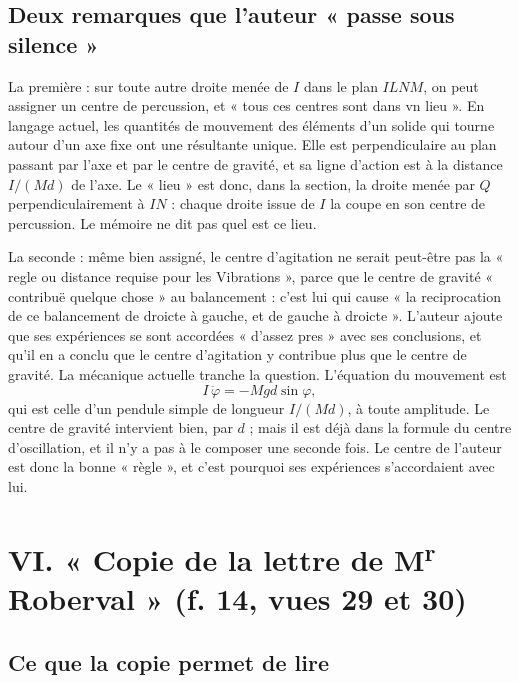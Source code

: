 \documentclass[11pt,a4paper]{article}
\begin{document}
\subsection*{Deux remarques que l'auteur « passe sous silence »}

La première : sur toute autre droite menée de \(I\) dans le plan \(ILNM\), on
peut assigner un centre de percussion, et « tous ces centres sont dans vn
lieu ». En langage actuel, les quantités de mouvement des éléments d'un solide
qui tourne autour d'un axe fixe ont une résultante unique. Elle est
perpendiculaire au plan passant par l'axe et par le centre de gravité, et sa
ligne d'action est à la distance \(I/(Md)\) de l'axe. Le « lieu » est donc,
dans la section, la droite menée par \(Q\) perpendiculairement à \(IN\) :
chaque droite issue de \(I\) la coupe en son centre de percussion. Le mémoire
ne dit pas quel est ce lieu.

La seconde : même bien assigné, le centre d'agitation ne serait peut-être pas la
« regle ou distance requise pour les Vibrations », parce que le centre de gravité
« contribuë quelque chose » au balancement : c'est lui qui cause « la
reciprocation de ce balancement de droicte à gauche, et de gauche à droicte ».
L'auteur ajoute que ses expériences se sont accordées « d'assez pres » avec ses
conclusions, et qu'il en a conclu que le centre d'agitation y contribue plus que
le centre de gravité. La mécanique actuelle tranche la question. L'équation du
mouvement est
\[
I\,\ddot\varphi=-Mgd\sin\varphi ,
\]
qui est celle d'un pendule simple de longueur \(I/(Md)\), à toute amplitude.
Le centre de gravité intervient bien, par \(d\) ; mais il est déjà dans la
formule du centre d'oscillation, et il n'y a pas à le composer une seconde
fois. Le centre de l'auteur est donc la bonne « règle », et c'est pourquoi ses
expériences s'accordaient avec lui.

\section*{VI. « Copie de la lettre de M\textsuperscript{r} Roberval » (f. 14, vues 29 et 30)}

\subsection*{Ce que la copie permet de lire}
\end{document}
